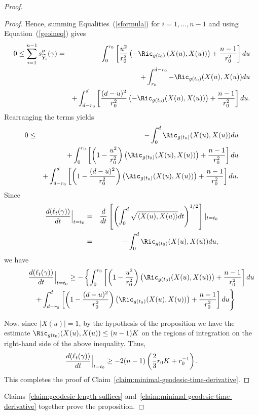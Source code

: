 \begin{proof}
\begin{proof}
Hence, summing Equalities~(\ref{sformula}) for $i=1,\ldots, n-1$ and
using Equation~(\ref{geoineq}) gives
\begin{eqnarray*}
0\le\sum_{i=1}^{n-1}s''_{\widetilde Y_i}(\gamma) & = &
\int_0^{r_0}\left[\frac{u^2}{r_0^2}\left(-\Ric_{g(t_0)}\left(X(u),X(u)\right)\right)
+\frac{n-1}{r_0^2}\right]du
\\
& & + \int_{r_0}^{d-r_0}-\Ric_{g(t_0)}(X(u),X(u))du
\\
 & & +\int_{d-r_0}^d\left[\frac{(d-u)^2}{r_0^2}
\left(-\Ric_{g(t_0)}(X(u),X(u))\right)+\frac{n-1}{r_0^2}\right]du.\end{eqnarray*}
Rearranging the terms yields
\begin{eqnarray*} 0 & \le & -\int_0^d \Ric_{g(t_0)}(X(u),X(u))du \\
& &+\int_0^{r_0}\left[\left(1-\frac{u^2}{r_0^2}\right)
\left(\Ric_{g(t_0)}(X(u),X(u))\right) +\frac{n-1}{r_0^2}\right]du\\
& & +\int_{d-r_0}^d
\left[\left(1-\frac{(d-u)^2}{r_0^2}\right)\left(\Ric_{g(t_0)}(X(u),X(u))\right)
+\frac{n-1}{r_0^2}\right]du.
\end{eqnarray*}
Since
\begin{eqnarray*}
\frac{d(\ell_t(\gamma))}{dt}\Bigl|_{t=t_0}\Bigr. & = &
\frac{d}{dt}\left[\left(\int_0^d\sqrt{\langle X(u),X(u)\rangle}dt\right)^{1/2}\right]|_{t=t_0} \\
& = & -\int_0^d \Ric_{g(t_0)}(X(u),X(u))du,
\end{eqnarray*}
we have
\begin{eqnarray*}
\lefteqn{\frac{d(\ell_t(\gamma))}{dt}\Bigl|_{t=t_0}\Bigr.\ge
-\left\{\int_0^{r_0}\left[\left(1-\frac{u^2}{r_0^2}\right)\left(\Ric_{g(t_0)}(X(u),X(u))\right)
+\frac{n-1}{r_0^2}\right]du\right.}
\\
& & \left. +\int_{d-r_0}^d
\left[\left(1-\frac{(d-u)^2}{r_0^2}\right)\left(\Ric_{g(t_0)}(X(u),X(u))\right)
+\frac{n-1}{r_0^2}\right]du\right\}
\end{eqnarray*}


Now, since $|X(u)|=1$, by the hypothesis of the proposition we have
the estimate $\Ric_{g(t_0)}(X(u),X(u))\le (n-1)K$ on the regions of
integration on the right-hand side of the above inequality. Thus,
\begin{eqnarray*}
\frac{d(\ell_t(\gamma))}{dt}\Bigl|_{t=t_0}\Bigr.\ge
-2(n-1)\left(\frac{2}{3}r_0K+r_0^{-1}\right).
\end{eqnarray*}
This completes the proof of Claim~\ref{claim:minimal-geodesic-time-derivative}.
\end{proof}

Claims~\ref{claim:geodesic-length-suffices} and~\ref{claim:minimal-geodesic-time-derivative} together prove the proposition.
\end{proof}


